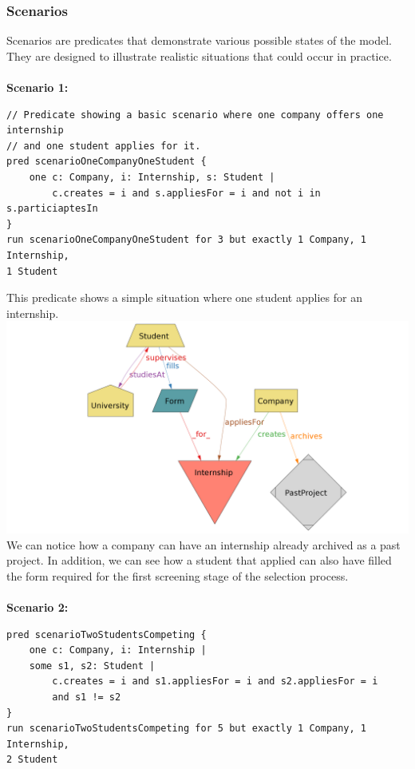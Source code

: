 \documentclass[11pt,twoside]{article}
\begin{document}
		\subsubsection{Scenarios}
Scenarios are predicates that demonstrate various possible states of the model. They are designed to illustrate realistic situations that could occur in practice. \\
\vspace{1\baselineskip} \\
\textbf{Scenario 1:} \\
{\small
\begin{verbatim}
// Predicate showing a basic scenario where one company offers one internship
// and one student applies for it.
pred scenarioOneCompanyOneStudent {
    one c: Company, i: Internship, s: Student |
        c.creates = i and s.appliesFor = i and not i in s.particiaptesIn
}
run scenarioOneCompanyOneStudent for 3 but exactly 1 Company, 1 Internship,
1 Student
\end{verbatim}}
This predicate shows a simple situation where one student applies for an internship. \\
\newpage
\includegraphics[width=\textwidth]{Images/Scenario1}
We can notice how a company can have an internship already archived as a past project. In addition, we can see how a student that applied can also have filled the form required for the first screening stage of the selection process. \\
\vspace{1\baselineskip} \\
\textbf{Scenario 2:}
{\small
\begin{verbatim}
pred scenarioTwoStudentsCompeting {
    one c: Company, i: Internship | 
    some s1, s2: Student |
        c.creates = i and s1.appliesFor = i and s2.appliesFor = i
        and s1 != s2
}
run scenarioTwoStudentsCompeting for 5 but exactly 1 Company, 1 Internship,
2 Student
\end{verbatim}}
\end{document}
